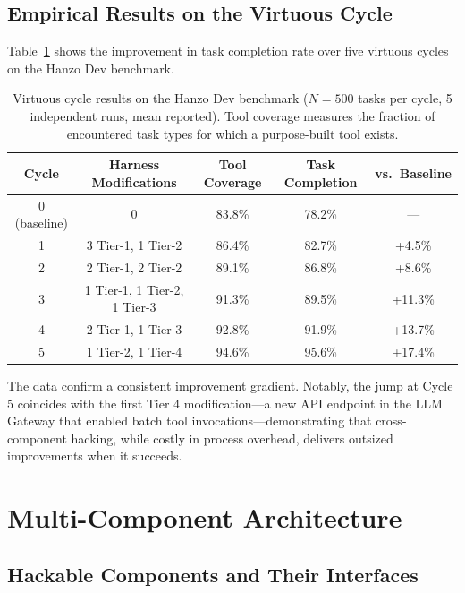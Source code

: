 \documentclass[11pt]{article}
\begin{document}
\subsection{Empirical Results on the Virtuous Cycle}
\label{sec:virtuous-empirical}

Table~\ref{tab:virtuous} shows the improvement in task completion rate over five
virtuous cycles on the Hanzo Dev benchmark.

\begin{table}[H]
\centering
\begin{tabular}{ccccc}
\toprule
Cycle & Harness Modifications & Tool Coverage & Task Completion & vs.\ Baseline \\
\midrule
0 (baseline) & 0 & 83.8\% & 78.2\% & --- \\
1 & 3 Tier-1, 1 Tier-2 & 86.4\% & 82.7\% & +4.5\% \\
2 & 2 Tier-1, 2 Tier-2 & 89.1\% & 86.8\% & +8.6\% \\
3 & 1 Tier-1, 1 Tier-2, 1 Tier-3 & 91.3\% & 89.5\% & +11.3\% \\
4 & 2 Tier-1, 1 Tier-3 & 92.8\% & 91.9\% & +13.7\% \\
5 & 1 Tier-2, 1 Tier-4 & 94.6\% & 95.6\% & +17.4\% \\
\bottomrule
\end{tabular}
\caption{Virtuous cycle results on the Hanzo Dev benchmark ($N=500$ tasks per cycle,
5 independent runs, mean reported). Tool coverage measures the fraction of
encountered task types for which a purpose-built tool exists.}
\label{tab:virtuous}
\end{table}

The data confirm a consistent improvement gradient. Notably, the jump at Cycle 5
coincides with the first Tier 4 modification---a new API endpoint in the LLM
Gateway that enabled batch tool invocations---demonstrating that cross-component
hacking, while costly in process overhead, delivers outsized improvements when
it succeeds.

\section{Multi-Component Architecture}
\label{sec:architecture}

\subsection{Hackable Components and Their Interfaces}
\label{sec:components}
\end{document}
